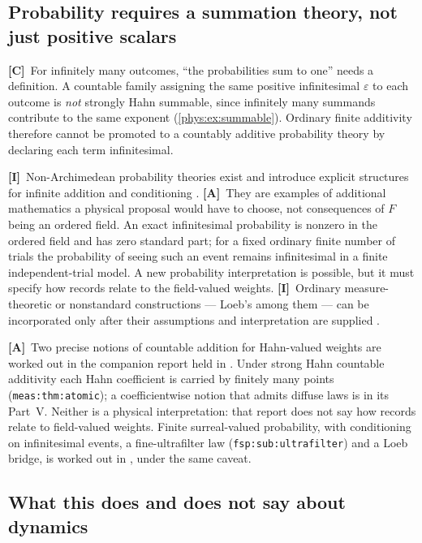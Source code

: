 \documentclass[11pt,letterpaper]{article}
\numberwithin{equation}{section}
\theoremstyle{definition}
\theoremstyle{remark}
\newcommand{\eps}{\varepsilon}
\newcommand{\TC}{\textcolor{TierC}{\textsf{\bfseries[C]}}}
\newcommand{\TA}{\textcolor{TierA}{\textsf{\bfseries[A]}}}
\newcommand{\TI}{\textcolor{TierI}{\textsf{\bfseries[I]}}}
\begin{document}
\subsection{Probability requires a summation theory, not just positive scalars}
\label{phys:sub:probability}

\TC\ For infinitely many outcomes, ``the probabilities sum to one'' needs a
definition. A countable family assigning the same positive infinitesimal $\eps$
to each outcome is \emph{not} strongly Hahn summable, since infinitely many
summands contribute to the same exponent (\cref{phys:ex:summable}). Ordinary
finite additivity therefore cannot be promoted to a countably additive
probability theory by declaring each term infinitesimal.

\TI\ Non-Archimedean probability theories exist and introduce explicit
structures for infinite addition and conditioning \cite{phys:BHW}. \TA\ They
are examples of additional mathematics a physical proposal would have to
choose, not consequences of $F$ being an ordered field. An exact infinitesimal
probability is nonzero in the ordered field and has zero standard part; for a
fixed ordinary finite number of trials the probability of seeing such an event
remains infinitesimal in a finite independent-trial model. A new probability
interpretation is possible, but it must specify how records relate to the
field-valued weights. \TI\ Ordinary measure-theoretic or nonstandard
constructions --- Loeb's among them --- can be incorporated only after their
assumptions and interpretation are supplied \cite{phys:Loeb}.

\TA\ Two precise notions of countable addition for Hahn-valued weights are
worked out in the companion report held in
. Under strong Hahn
countable additivity each Hahn coefficient is carried by finitely many points
(\texttt{meas:thm:atomic}); a coefficientwise notion that admits diffuse laws
is in its Part~V. Neither is a physical interpretation: that report does not
say how records relate to field-valued weights. Finite surreal-valued probability,
with conditioning on infinitesimal events, a fine-ultrafilter law
(\texttt{fsp:sub:ultrafilter}) and a Loeb bridge, is worked out in
, under the same caveat.

\subsection{What this does and does not say about dynamics}
\label{phys:sub:dynamics}
\end{document}
